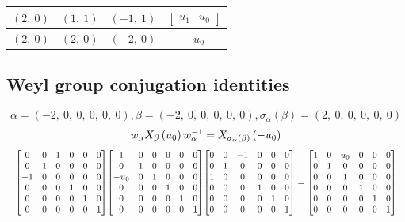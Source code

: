 \documentclass[11pt]{article}
\theoremstyle{definition}
\begin{document}
\begin{longtable}{|l|l|l|c|}
    \hline
    $\left( 2, \  0\right)$ & $\left( 1, \  1\right)$ & $\left( -1, \  1\right)$ & $\left[\begin{matrix}u_{1} & u_{0}\end{matrix}\right]$ \\
    \hline
    $\left( 2, \  0\right)$ & $\left( 2, \  0\right)$ & $\left( -2, \  0\right)$ & $- u_{0}$ \\
    \hline
\end{longtable}


\subsection{Weyl group conjugation identities}

\providecommand{\scaletoalign}[2]{%
  \sbox0{$#2$}%
  \ifdim\wd0>#1\relax 
    \resizebox{#1}{!}{\usebox0}%
  \else 
    \usebox0%
  \fi 
}
\[
\alpha = \left( -2, \  0, \  0, \  0, \  0, \  0\right), \beta = \left( -2, \  0, \  0, \  0, \  0, \  0\right), \sigma_{\alpha}(\beta) = \left( 2, \  0, \  0, \  0, \  0, \  0\right)
\]
\[
\scaletoalign{\textwidth}{w_{\alpha} X_{\beta}\left(u_{0}\right) w_{\alpha}^{-1} = X_{\sigma_{\alpha}\left(\beta\right)}\left(- u_{0}\right)}
\]
\[
\scaletoalign{\textwidth}{{\left[\begin{matrix}0 & 0 & 1 & 0 & 0 & 0\\0 & 1 & 0 & 0 & 0 & 0\\-1 & 0 & 0 & 0 & 0 & 0\\0 & 0 & 0 & 1 & 0 & 0\\0 & 0 & 0 & 0 & 1 & 0\\0 & 0 & 0 & 0 & 0 & 1\end{matrix}\right]} {\left[\begin{matrix}1 & 0 & 0 & 0 & 0 & 0\\0 & 1 & 0 & 0 & 0 & 0\\- u_{0} & 0 & 1 & 0 & 0 & 0\\0 & 0 & 0 & 1 & 0 & 0\\0 & 0 & 0 & 0 & 1 & 0\\0 & 0 & 0 & 0 & 0 & 1\end{matrix}\right]} {\left[\begin{matrix}0 & 0 & -1 & 0 & 0 & 0\\0 & 1 & 0 & 0 & 0 & 0\\1 & 0 & 0 & 0 & 0 & 0\\0 & 0 & 0 & 1 & 0 & 0\\0 & 0 & 0 & 0 & 1 & 0\\0 & 0 & 0 & 0 & 0 & 1\end{matrix}\right]} = {\left[\begin{matrix}1 & 0 & u_{0} & 0 & 0 & 0\\0 & 1 & 0 & 0 & 0 & 0\\0 & 0 & 1 & 0 & 0 & 0\\0 & 0 & 0 & 1 & 0 & 0\\0 & 0 & 0 & 0 & 1 & 0\\0 & 0 & 0 & 0 & 0 & 1\end{matrix}\right]}}
\]
\end{document}
